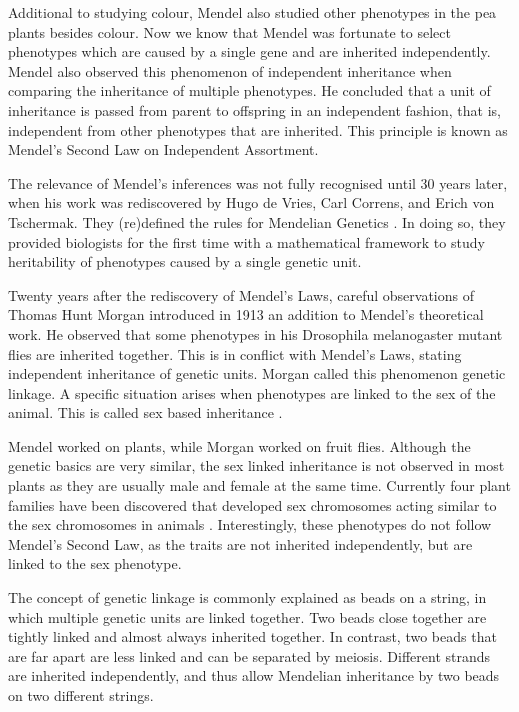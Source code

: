 Additional to studying colour, Mendel also studied other phenotypes in the pea plants besides colour. Now we know 
that Mendel was fortunate to select phenotypes which are caused by a single gene and are inherited independently. 
Mendel also observed this phenomenon of independent inheritance when comparing the inheritance of multiple 
phenotypes. He concluded that a unit of inheritance is passed from parent to offspring in an independent fashion, 
that is, independent  from other phenotypes that are inherited. This principle is known as Mendel's Second Law 
on Independent Assortment.

The relevance of Mendel's inferences was not fully recognised until 30 years later, when his work was rediscovered 
by Hugo de Vries, Carl Correns, and Erich von Tschermak. They (re)defined the rules for Mendelian Genetics \cite{deVries:1889}. 
In doing so, they provided biologists for the first time with a mathematical framework to study heritability of 
phenotypes caused by a single genetic unit.

Twenty years after the rediscovery of Mendel's Laws, careful observations of Thomas Hunt Morgan introduced in 1913 
an addition to Mendel's theoretical work. He observed that some phenotypes in his Drosophila melanogaster mutant 
flies are inherited together. This is in conflict with Mendel's Laws, stating independent inheritance of genetic 
units. Morgan called this phenomenon genetic linkage. A specific situation arises when phenotypes are linked to 
the sex of the animal. This is called sex based inheritance \cite{Morgan:1915, Morgan:1916}.

Mendel worked on plants, while Morgan worked on fruit flies. Although the genetic basics are very similar, the sex 
linked inheritance is not observed in most plants as they are usually male and female at the same time. Currently 
four plant families have been discovered that developed sex chromosomes acting similar to the sex chromosomes in 
animals \cite{Ming:2007}. Interestingly, these phenotypes do not follow Mendel's Second Law, as the traits are not 
inherited independently, but are linked to the sex phenotype. 

The concept of genetic linkage is commonly explained as beads on a string, in which multiple genetic units are 
linked together.  Two beads close together are tightly linked and almost always inherited together. In contrast, 
two beads that are far apart are less linked and can be separated by meiosis. Different strands are inherited 
independently, and thus allow Mendelian inheritance by two beads on two different strings. 

